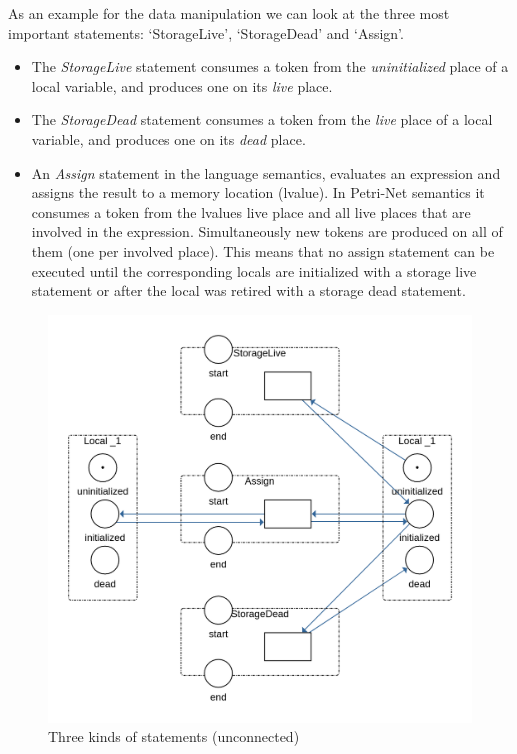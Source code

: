As an example for the data manipulation we can look at the three most important statements: `StorageLive', `StorageDead' and `Assign'.
\begin{itemize}
    \item The \textit{StorageLive} statement consumes a token from the \textit{uninitialized} place of a local variable, and produces one on its \textit{live} place.
    \item The \textit{StorageDead} statement consumes a token from the \textit{live} place of a local variable, and produces one on its \textit{dead} place.
    \item An \textit{Assign} statement in the language semantics, evaluates an expression and assigns the result to a memory location (lvalue).
    In Petri-Net semantics it consumes a token from the lvalues live place and all live places that are involved in the expression.
    Simultaneously new tokens are produced on all of them (one per involved place).
    This means that no assign statement can be executed until the corresponding locals are initialized with a storage live statement or after the local was retired with a storage dead statement.
\end{itemize}

\begin{figure}
    \centering
    \includegraphics[width=.9\textwidth]{../diagrams/StatementsNet.png}
    \caption{Three kinds of statements (unconnected)}
    \label{statements_net}
\end{figure}

